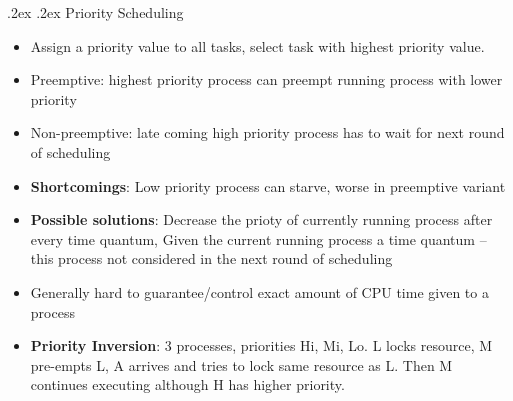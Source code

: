 \documentclass[10pt,landscape,a4paper]{article}
\makeatletter
\renewcommand{\subsubsection}{\@startsection{subsubsection}{1}{0mm}%
  {.2ex}%
  {.2ex}%
{\rmfamily\bfseries}}
\makeatother
\begin{document}
\begin{multicols*}{4}
  \subsubsection{Priority Scheduling}
  \begin{itemize}
    \item Assign a priority value to all tasks, select task with highest priority value.
    \item Preemptive: highest priority process can preempt running process with lower priority
    \item Non-preemptive: late coming high priority process has to wait for next round of scheduling
    \item \textbf{Shortcomings}: Low priority process can starve, worse in preemptive variant
    \item \textbf{Possible solutions}: Decrease the prioty of currently running process after every time quantum, Given the current running process a time quantum -- this process not considered in the next round of scheduling
    \item Generally hard to guarantee/control exact amount of CPU time given to a process
    \item \textbf{Priority Inversion}: 3 processes, priorities Hi, Mi, Lo. L locks resource, M pre-empts L, A arrives and tries to lock same resource as L. Then M continues executing although H has higher priority.
  \end{itemize}

\end{multicols*}
\end{document}
